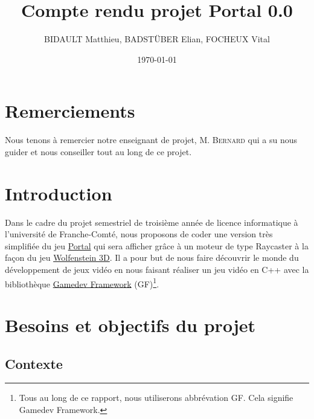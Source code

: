 \documentclass[12pt]{report}
\title{Compte rendu projet Portal 0.0}
\author{BIDAULT Matthieu, BADSTÜBER Elian, FOCHEUX Vital}
\date{\today}
\begin{document}
\maketitle

\section*{Remerciements}

Nous tenons à remercier notre enseignant de projet, M. \textsc{Bernard} 
qui a su nous guider et nous conseiller tout au long de ce projet.


\tableofcontents

\section{Introduction}

Dans le cadre du projet semestriel de troisième année de licence
informatique à l'université de Franche-Comté, nous proposons de coder
une version très simplifiée du jeu \href{https://fr.wikipedia.org/wiki/Portal_(jeu_vid%C3%A9o)}{Portal}
qui sera afficher grâce à un moteur de type Raycaster à la façon du jeu
\href{https://fr.wikipedia.org/wiki/Wolfenstein_3D}{Wolfenstein 3D}.
Il a pour but de nous faire découvrir le monde du développement de jeux 
vidéo en nous faisant réaliser un jeu vidéo en C++ avec la bibliothèque 
\href{https://gamedevframework.github.io/}{Gamedev Framework} (GF)\footnote{Tous au long de ce rapport, nous utiliserons abbrévation GF.
Cela signifie Gamedev Framework.}.


\section{Besoins et objectifs du projet}
\subsection{Contexte}
\end{document}
